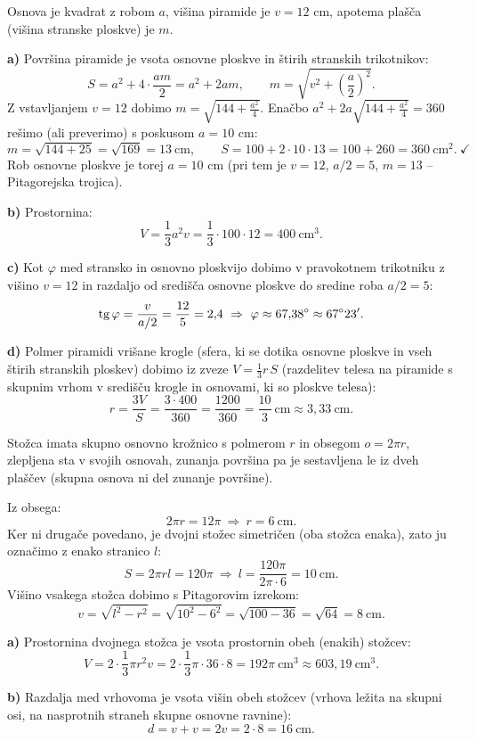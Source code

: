 \documentclass[a4paper,12pt]{letter}
\begin{document}
\begin{resitev}
Osnova je kvadrat z robom $a$, vi\v{s}ina piramide je $v=12$ cm, apotema pla\v{s}\v{c}a (vi\v{s}ina stranske ploskve) je $m$.

\textbf{a)} Povr\v{s}ina piramide je vsota osnovne ploskve in \v{s}tirih stranskih trikotnikov:
\[
S=a^2+4\cdot\frac{am}{2}=a^2+2am,\qquad m=\sqrt{v^2+\left(\frac a2\right)^2}.
\]
Z vstavljanjem $v=12$ dobimo $m=\sqrt{144+\tfrac{a^2}4}$. Ena\v{c}bo $a^2+2a\sqrt{144+\tfrac{a^2}4}=360$ re\v{s}imo (ali preverimo) s poskusom $a=10$ cm:
\[
m=\sqrt{144+25}=\sqrt{169}=13\ \text{cm},\qquad S=100+2\cdot10\cdot13=100+260=360\ \text{cm}^2.\ \checkmark
\]
Rob osnovne ploskve je torej $a=10$ cm (pri tem je $v=12$, $a/2=5$, $m=13$ -- Pitagorejska trojica).

\textbf{b)} Prostornina:
\[
V=\frac13a^2v=\frac13\cdot100\cdot12=400\ \text{cm}^3.
\]

\textbf{c)} Kot $\varphi$ med stransko in osnovno ploskvijo dobimo v pravokotnem trikotniku z vi\v{s}ino $v=12$ in razdaljo od sredi\v{s}\v{c}a osnovne ploskve do sredine roba $a/2=5$:
\[
\operatorname{tg}\varphi=\frac{v}{a/2}=\frac{12}{5}=2{,}4\ \Rightarrow\ \varphi\approx67{,}38\degree\approx67\degree23'.
\]

\textbf{d)} Polmer piramidi vri\v{s}ane krogle (sfera, ki se dotika osnovne ploskve in vseh \v{s}tirih stranskih ploskev) dobimo iz zveze $V=\frac13 r\, S$ (razdelitev telesa na piramide s skupnim vrhom v sredi\v{s}\v{c}u krogle in osnovami, ki so ploskve telesa):
\[
r=\frac{3V}{S}=\frac{3\cdot400}{360}=\frac{1200}{360}=\frac{10}{3}\ \text{cm}\approx3{,}33\ \text{cm}.
\]
\end{resitev}

\newpage
\begin{resitev}
Sto\v{z}ca imata skupno osnovno kro\v{z}nico s polmerom $r$ in obsegom $o=2\pi r$, zlepljena sta v svojih osnovah, zunanja povr\v{s}ina pa je sestavljena le iz dveh pla\v{s}\v{c}ev (skupna osnova ni del zunanje povr\v{s}ine).

Iz obsega:
\[
2\pi r=12\pi\ \Rightarrow\ r=6\ \text{cm}.
\]
Ker ni druga\v{c}e povedano, je dvojni sto\v{z}ec simetri\v{c}en (oba sto\v{z}ca enaka), zato ju ozna\v{c}imo z enako stranico $l$:
\[
S=2\pi rl=120\pi\ \Rightarrow\ l=\frac{120\pi}{2\pi\cdot6}=10\ \text{cm}.
\]
Vi\v{s}ino vsakega sto\v{z}ca dobimo s Pitagorovim izrekom:
\[
v=\sqrt{l^2-r^2}=\sqrt{10^2-6^2}=\sqrt{100-36}=\sqrt{64}=8\ \text{cm}.
\]

\textbf{a)} Prostornina dvojnega sto\v{z}ca je vsota prostornin obeh (enakih) sto\v{z}cev:
\[
V=2\cdot\frac13\pi r^2v=2\cdot\frac13\pi\cdot36\cdot8=192\pi\ \text{cm}^3\approx603{,}19\ \text{cm}^3.
\]

\textbf{b)} Razdalja med vrhovoma je vsota vi\v{s}in obeh sto\v{z}cev (vrhova le\v{z}ita na skupni osi, na nasprotnih straneh skupne osnovne ravnine):
\[
d=v+v=2v=2\cdot8=16\ \text{cm}.
\]
\end{resitev}
\end{document}
